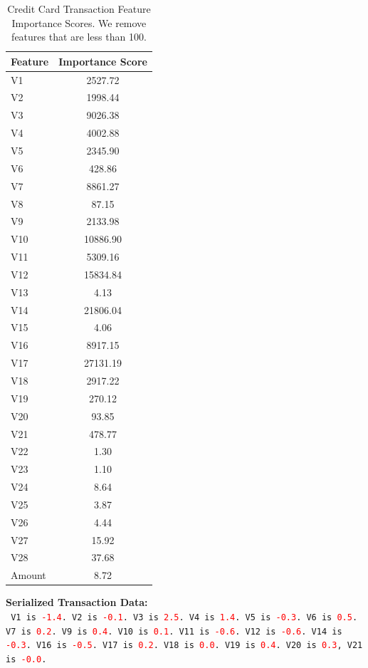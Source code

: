 \documentclass{article}
\theoremstyle{plain}
\theoremstyle{definition}
\theoremstyle{remark}
\begin{document}
\begin{table}[h!]
\centering
\caption{Credit Card Transaction Feature Importance Scores. We remove features that are less than 100.}
\begin{tabular}{lc}
\toprule
\textbf{Feature} & \textbf{Importance Score} \\
\midrule
V1 & 2527.72 \\
V2 & 1998.44 \\
V3 & 9026.38 \\
V4 & 4002.88 \\
V5 & 2345.90 \\
V6 & 428.86 \\
V7 & 8861.27 \\
V8 & 87.15 \\
V9 & 2133.98 \\
V10 & 10886.90 \\
V11 & 5309.16 \\
V12 & 15834.84 \\
V13 & 4.13 \\
V14 & 21806.04 \\
V15 & 4.06 \\
V16 & 8917.15 \\
V17 & 27131.19 \\
V18 & 2917.22 \\
V19 & 270.12 \\
V20 & 93.85 \\
V21 & 478.77 \\
V22 & 1.30 \\
V23 & 1.10 \\
V24 & 8.64 \\
V25 & 3.87 \\
V26 & 4.44 \\
V27 & 15.92 \\
V28 & 37.68 \\
Amount & 8.72 \\
\bottomrule
\end{tabular}
\end{table}

\begin{mdframed}
\textbf{Serialized Transaction Data:}\\
\texttt{%
V1 is \textcolor{red}{-1.4}. V2 is \textcolor{red}{-0.1}. V3 is \textcolor{red}{2.5}. V4 is \textcolor{red}{1.4}. V5 is \textcolor{red}{-0.3}. V6 is \textcolor{red}{0.5}. V7 is \textcolor{red}{0.2}. V9 is \textcolor{red}{0.4}. V10 is \textcolor{red}{0.1}. V11 is \textcolor{red}{-0.6}. V12 is \textcolor{red}{-0.6}. V14 is \textcolor{red}{-0.3}.
V16 is \textcolor{red}{-0.5}. V17 is \textcolor{red}{0.2}. V18 is \textcolor{red}{0.0}. V19 is \textcolor{red}{0.4}. V20 is \textcolor{red}{0.3}, V21 is \textcolor{red}{-0.0}.
}
\end{mdframed}
\end{document}
